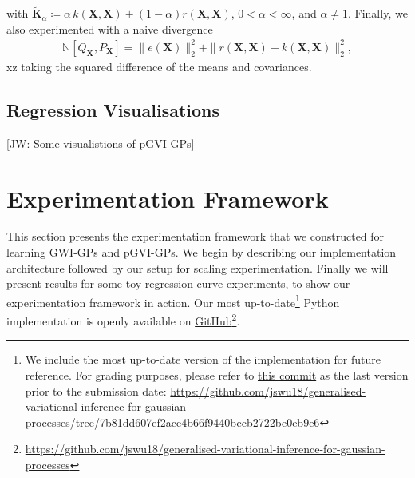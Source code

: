 \documentclass{article}
\newcommand{\jw}[1]{{\color{gray} [JW: #1]}}
\numberwithin{equation}{section}
\begin{document}
with $\tilde{\textbf{K}}_{\alpha} \coloneqq \alpha \, k(\mathbf{X}, \mathbf{X}) + (1-\alpha)  r(\mathbf{X}, \mathbf{X})$, $0 < \alpha < \infty$, and $\alpha \neq 1$.
Finally, we also experimented with a naive divergence
\begin{align}
    \mathbb{N} \left[Q_{\mathbf{X}}, P_{\mathbf{X}}\right] = \| e(\mathbf{X})\|_2^2 + \|r(\mathbf{X}, \mathbf{X})-k(\mathbf{X}, \mathbf{X})\|_2^2,
\end{align}xz
taking the squared difference of the means and covariances. 

\subsection{Regression Visualisations}
\jw{Some visualistions of pGVI-GPs}

\newpage
\section{Experimentation Framework}
This section presents the experimentation framework that we constructed for learning GWI-GPs and pGVI-GPs. 
We begin by describing our implementation architecture followed by our setup for scaling experimentation. 
Finally we will present results for some toy regression curve experiments, to show our experimentation framework in action.
Our most up-to-date\footnote{We include the most up-to-date version of the implementation for future reference. For grading purposes, please refer to \href{https://github.com/jswu18/generalised-variational-inference-for-gaussian-processes/tree/7b81dd607ef2ace4b66f9440becb2722be0eb9e6}{this commit} as the last version prior to the submission date: \href{https://github.com/jswu18/generalised-variational-inference-for-gaussian-processes/tree/7b81dd607ef2ace4b66f9440becb2722be0eb9e6}{https://github.com/jswu18/generalised-variational-inference-for-gaussian-processes/tree/7b81dd607ef2ace4b66f9440becb2722be0eb9e6}} Python implementation is openly available on \href{https://github.com/jswu18/generalised-variational-inference-for-gaussian-processes}{GitHub}\footnote{\href{https://github.com/jswu18/generalised-variational-inference-for-gaussian-processes}{https://github.com/jswu18/generalised-variational-inference-for-gaussian-processes}}. 
\end{document}
